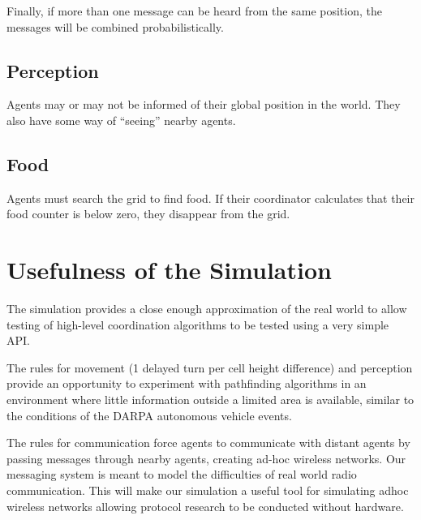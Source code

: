 Finally, if more than one message can be heard from the same position, the messages will be combined probabilistically.


\subsection{Perception}

Agents may or may not be informed of their global position in the world. They also have some way of ``seeing'' nearby agents.

\subsection{Food}

Agents must search the grid to find food. If their coordinator calculates that their food counter is below zero, they disappear from the grid.

\section{Usefulness of the Simulation}

The simulation provides a close enough approximation of the real world to allow testing of high-level coordination algorithms to be tested using a very simple API.

The rules for movement (1 delayed turn per cell height difference) and perception provide an opportunity to experiment with pathfinding algorithms in an environment where little information outside a limited area is available, similar to the conditions of the DARPA autonomous vehicle events.

The rules for communication force agents to communicate with distant agents by passing messages through nearby agents, creating ad-hoc wireless networks. Our messaging system is meant to model the difficulties of real world radio communication. This will make our simulation a useful tool for simulating adhoc wireless networks allowing protocol research to be conducted without hardware.
